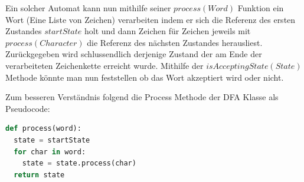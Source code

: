 Ein solcher Automat kann nun mithilfe seiner $process(Word)$ Funktion ein Wort (Eine Liste von Zeichen) verarbeiten indem er sich die Referenz des ersten Zustandes $startState$ holt und dann Zeichen für Zeichen jeweils mit $process(Character)$ die Referenz des nächsten Zustandes herausliest. Zurückgegeben wird schlussendlich derjenige Zustand der am Ende der verarbeiteten Zeichenkette erreicht wurde. Mithilfe der $isAcceptingState(State)$ Methode könnte man nun feststellen ob das Wort akzeptiert wird oder nicht. 

Zum besseren Verständnis folgend die Process Methode der DFA Klasse als Pseudocode:

\begin{lstlisting}[language=Python, caption={Process Methode der DFA Klasse}]
def process(word):
  state = startState
  for char in word:
    state = state.process(char)
  return state
\end{lstlisting}
